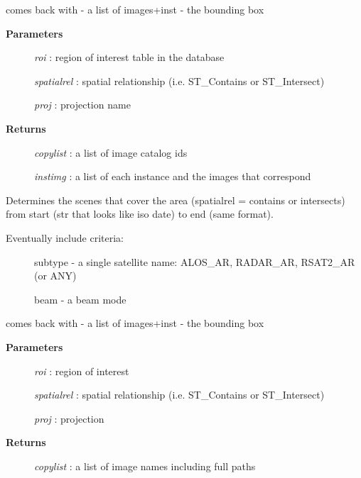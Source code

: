 \documentclass[letterpaper,10pt,english]{sphinxmanual}
\begin{document}
\begin{fulllineitems}
\begin{fulllineitems}
\begin{description}
\end{description}

comes back with - a list of images+inst - the bounding box
\begin{description}
\item[{\textbf{Parameters}}] \leavevmode
\emph{roi}   :   region of interest table in the database

\emph{spatialrel}    :   spatial relationship (i.e. ST\_Contains or ST\_Intersect)

\emph{proj}  :   projection name

\item[{\textbf{Returns}}] \leavevmode
\emph{copylist}  :   a list of image catalog ids

\emph{instimg}   :   a list of each instance and the images that correspond

\end{description}

\end{fulllineitems}


\begin{fulllineitems}
\label{code:Database.Database.qrySelectFromLocal}
Determines the scenes that cover the area (spatialrel = contains or intersects)
from start (str that looks like iso date) to end (same format).
\begin{description}
\item[{Eventually include criteria:}] \leavevmode
subtype - a single satellite name: ALOS\_AR, RADAR\_AR, RSAT2\_AR (or ANY)

beam - a beam mode

\end{description}

comes back with - a list of images+inst - the bounding box
\begin{description}
\item[{\textbf{Parameters}}] \leavevmode
\emph{roi} : region of interest

\emph{spatialrel}    :   spatial relationship (i.e. ST\_Contains or ST\_Intersect)

\emph{proj}  :   projection

\item[{\textbf{Returns}}] \leavevmode
\emph{copylist}  :   a list of image names including full paths


\end{description}
\end{fulllineitems}
\end{fulllineitems}
\end{document}

